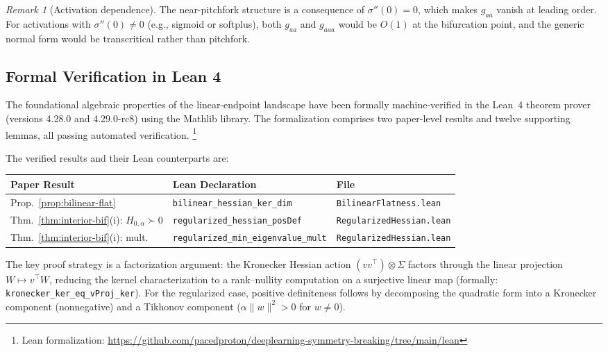 \documentclass[11pt, reqno]{amsart}
\theoremstyle{plain}
\theoremstyle{definition}
\theoremstyle{remark}
\newtheorem{remark}[theorem]{Remark}
\begin{document}
\begin{remark}[Activation dependence]\label{rem:activation-dep}
The near-pitchfork structure is a consequence of $\sigma''(0)=0$, which makes $g_{aa}$ vanish at leading order.  For activations with $\sigma''(0)\neq 0$ (e.g., sigmoid or softplus), both $g_{aa}$ and $g_{aaa}$ would be $O(1)$ at the bifurcation point, and the generic normal form would be transcritical rather than pitchfork.
\end{remark}

\subsection{Formal Verification in Lean 4}\label{ssec:lean}
 
The foundational algebraic properties of the linear-endpoint landscape have been formally machine-verified in the Lean~4 theorem prover (versions 4.28.0 and 4.29.0-rc8) using the Mathlib library.  The formalization comprises two paper-level results and twelve supporting lemmas, all passing automated verification.  \footnote{Lean formalization: 
\url{https://github.com/pacedproton/deeplearning-symmetry-breaking/tree/main/lean}}
 
The verified results and their Lean counterparts are:
 
\smallskip
\begin{center}
\begin{tabularx}{\textwidth}{@{}lXl@{}}
\toprule
\textbf{Paper Result} & \textbf{Lean Declaration} & \textbf{File} \\
\midrule
Prop.~\ref{prop:bilinear-flat}
  & \texttt{bilinear\_hessian\_ker\_dim}
  & \texttt{BilinearFlatness.lean} \\[4pt]
Thm.~\ref{thm:interior-bif}(i): $H_{0,\alpha}\!\succ\! 0$
  & \texttt{regularized\_hessian\_posDef}
  & \texttt{RegularizedHessian.lean} \\[4pt]
Thm.~\ref{thm:interior-bif}(i): mult.
  & \texttt{regularized\_min\_eigenvalue\_mult}
  & \texttt{RegularizedHessian.lean} \\
\bottomrule
\end{tabularx}
\end{center}
\smallskip
 
The key proof strategy is a factorization argument: the Kronecker Hessian action $(vv^\top)\otimes\Sigma$ factors through the linear projection $W\mapsto v^\top W$, reducing the kernel characterization to a rank--nullity computation on a surjective linear map (formally: \texttt{kronecker\_ker\_eq\_vProj\_ker}).  For the regularized case, positive definiteness follows by decomposing the quadratic form into a Kronecker component (nonnegative) and a Tikhonov component ($\alpha\|w\|^2>0$ for $w\neq 0$).
 
\end{document}
